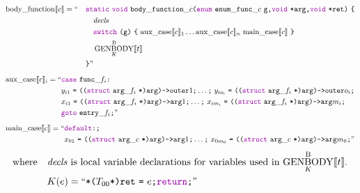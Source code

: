 \documentclass[a4paper,fleqn]{article}
\newcommand{\BRA}[1]{\llbracket #1 \rrbracket}
\DeclareMathOperator{\genbody}{GENBODY}
\newcommand{\genbodyb}[2]{\genbody^\mathrm{B}_{#1}\BRA{#2}}
\newcommand{\bodyfunction}[1]{\mathrm{body\_function}\BRA{#1}}
\newcommand{\auxcase}[2]{\mathrm{aux\_case}\BRA{#1}_{#2}}
\newcommand{\maincase}[1]{\mathrm{main\_case}\BRA{#1}}
\newcommand{\dq}[1]{\text{``}#1\text{''}}
\newcommand{\ttparen}[1]{\texttt{(}#1\texttt{)}}
\newcommand{\ttlbrace}{\texttt{\{}}
\newcommand{\ttrbrace}{\texttt{\}}}
\newcommand{\ttbrace}[1]{\texttt{\{}#1\texttt{\}}}
\newcommand{\tteq}{\texttt{=}}
\newcommand{\ttsemi}{\texttt{;}}
\newcommand{\ttcomma}{\texttt{,}}
\newcommand{\ttcolon}{\texttt{:}}
\newcommand{\ttstar}{\texttt{*}}
\newcommand{\kwswitch}{\mbox{\color{myviolet}\ttfamily switch}}
\newcommand{\kwgoto}{\mbox{\color{myviolet}\ttfamily goto}}
\newcommand{\kwstruct}{\mbox{\color{myviolet}\ttfamily struct}}
\newcommand{\kwvoid}{\mbox{\color{myviolet}\ttfamily void}}
\newcommand{\kwCreturn}{\mbox{\color{myviolet}\ttfamily return}}
\newcommand{\kwcase}{\mbox{\color{myviolet}\ttfamily case}}
\newcommand{\kwdefault}{\mbox{\color{myviolet}\ttfamily default}}
\newcommand{\kwenum}{\mbox{\color{myviolet}\ttfamily enum}}
\newcommand{\kwstatic}{\mbox{\color{myviolet}\ttfamily static}}
\begin{document}
\begin{alignat*}{2}
  \bodyfunction{c} &= \text{``}
    && \kwstatic~\kwvoid~\mathtt{body\_function\_}c\ttparen{\kwenum~\mathtt{enum\_func\_}c~\mathtt{g}\ttcomma \kwvoid~\ttstar\mathtt{arg}\ttcomma \kwvoid~\ttstar\mathtt{ret}}~\ttlbrace \\
  & && \quad \mathit{decls} \\
  & && \quad \kwswitch~\ttparen{\mathtt{g}}~\ttbrace{~\auxcase{c}{1} \dots \auxcase{c}{n}~\maincase{c}~} \\
  & && \quad \genbodyb{K}{t} \\
  & && \ttrbrace \text{''}
\end{alignat*}
\begin{align*}
  \auxcase{c}{i} = \text{``} & \kwcase~\mathtt{func\_}f_i\ttcolon \\
  & y_{i1}~\tteq~\ttparen{\ttparen{\kwstruct~\mathtt{arg\_}f_i~\ttstar}\mathtt{arg}}\texttt{->}\mathtt{outer}1\ttsemi \dots\ttsemi~y_{io_i}~\tteq~\ttparen{\ttparen{\kwstruct~\mathtt{arg\_}f_i~\ttstar}\mathtt{arg}}\texttt{->}\mathtt{outer}o_i\ttsemi \\
  & x_{i1}~\tteq~\ttparen{\ttparen{\kwstruct~\mathtt{arg\_}f_i~\ttstar}\mathtt{arg}}\texttt{->}\mathtt{arg}1\ttsemi \dots\ttsemi~x_{im_i}~\tteq~\ttparen{\ttparen{\kwstruct~\mathtt{arg\_}f_i~\ttstar}\mathtt{arg}}\texttt{->}\mathtt{arg}m_i\ttsemi \\
  & \kwgoto~\mathtt{entry\_}f_i\ttsemi \text{''}
\end{align*}
\begin{align*}
  \maincase{c} = \text{``} & \kwdefault\ttcolon\ttsemi \\
  & x_{01}~\tteq~\ttparen{\ttparen{\kwstruct~\mathtt{arg\_}c~\ttstar}\mathtt{arg}}\texttt{->}\mathtt{arg}1\ttsemi \dots\ttsemi~x_{0m_0}~\tteq~\ttparen{\ttparen{\kwstruct~\mathtt{arg\_}c~\ttstar}\mathtt{arg}}\texttt{->}\mathtt{arg}m_0\ttsemi \text{''}
\end{align*}
\[ \text{where} \quad
  \begin{aligned}[t]
    & \text{$\mathit{decls}$ is local variable declarations for variables used in $\genbodyb{K}{t}$.} \\
    & K(e) = \dq{\ttstar\ttparen{T_{00}\ttstar}\texttt{ret}~\tteq~e\ttsemi \kwCreturn\ttsemi}
  \end{aligned}
\]
\end{document}
